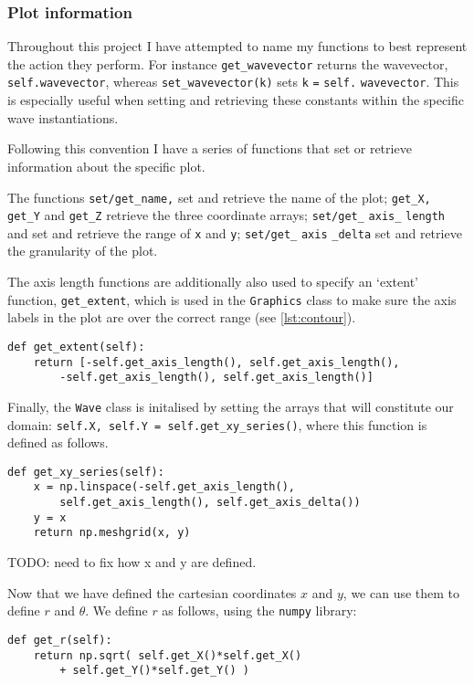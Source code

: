 \subsubsection{Plot information}
Throughout this project I have attempted to name my functions to best represent the action they perform. For instance \verb!get_wavevector! returns the wavevector, \verb!self.wavevector!, whereas \verb!set_wavevector(k)! sets \verb!k! \verb!=! \verb!self.! \verb!wavevector!. This is especially useful when setting and retrieving these constants within the specific wave instantiations. \par
%
Following this convention I have a series of functions that set or retrieve information about the specific plot. \par
%
The functions \verb!set/get_name,! set and retrieve the name of the plot; \verb!get_X,! \verb!get_Y! and \verb!get_Z! retrieve the three coordinate arrays; \verb!set/get_! \verb!axis_! \verb!length! and set and retrieve the range of \verb!x! and \verb!y!; \verb!set/get_! \verb!axis! \verb!_delta! set and retrieve the granularity of the plot. \par
%
The axis length functions are additionally also used to specify an `extent' function, \verb!get_extent!, which is used in the \verb!Graphics! class to make sure the axis labels in the plot are over the correct range (see \ref{lst:contour}). \par
%
  \begin{lstlisting}
def get_extent(self):
    return [-self.get_axis_length(), self.get_axis_length(),
        -self.get_axis_length(), self.get_axis_length()] \end{lstlisting}
%
Finally, the \verb!Wave! class is initalised by setting the arrays that will constitute our domain: \verb!self.X, self.Y = self.get_xy_series()!, where this function is defined as follows.
%
  \begin{lstlisting}
def get_xy_series(self):
    x = np.linspace(-self.get_axis_length(),
        self.get_axis_length(), self.get_axis_delta())
    y = x
    return np.meshgrid(x, y)\end{lstlisting}
%
TODO: need to fix how x and y are defined.\par
%
Now that we have defined the cartesian coordinates $x$ and $y$, we can use them to define $r$ and $\theta$. We define $r$ as follows, using the \verb!numpy! library:
%
  \begin{lstlisting}
def get_r(self):
    return np.sqrt( self.get_X()*self.get_X()
        + self.get_Y()*self.get_Y() )\end{lstlisting}
